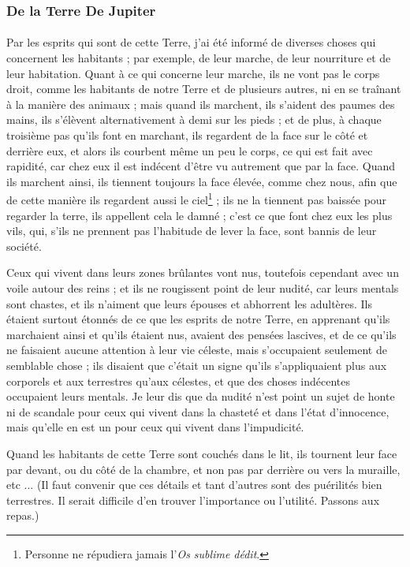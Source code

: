 \documentclass[a4paper, 11pt, oneside]{article}
\begin{document}
\subsubsection{De la Terre De Jupiter}
\paragraph{}
Par les esprits qui sont de cette Terre, j'ai été informé de diverses choses qui concernent les habitants ; par exemple, de leur marche, de leur nourriture et de leur habitation. Quant à ce qui concerne leur marche, ils ne vont pas le corps droit, comme les habitants de notre Terre et de plusieurs autres, ni en se traînant à la manière des animaux ; mais quand ils marchent, ils s'aident des paumes des mains, ils s'élèvent alternativement à demi sur les pieds ; et de plus, à chaque troisième pas qu'ils font en marchant, ils regardent de la face sur le côté et derrière eux, et alors ils courbent même un peu le corps, ce qui est fait avec rapidité, car chez eux il est indécent d'être vu autrement que par la face. Quand ils marchent ainsi, ils tiennent toujours la face élevée, comme chez nous, afin que de cette manière ils regardent aussi le ciel\footnote{Personne ne répudiera jamais l'\emph{Os sublime dédit}.} ; ils ne la tiennent pas baissée pour regarder la terre, ils appellent cela le damné ; c'est ce que font chez eux les plus vils, qui, s'ils ne prennent pas l'habitude de lever la face, sont bannis de leur société.

Ceux qui vivent dans leurs zones brûlantes vont nus, toutefois cependant avec un voile autour des reins ; et ils ne rougissent point de leur nudité, car leurs mentals sont chastes, et ils n'aiment que leurs épouses et abhorrent les adultères. Ils étaient surtout étonnés de ce que les esprits de notre Terre, en apprenant qu'ils marchaient ainsi et qu'ils étaient nus, avaient des pensées lascives, et de ce qu'ils ne faisaient aucune attention à leur vie céleste, mais s'occupaient seulement de semblable chose ; ils disaient que c'était un signe qu'ils s'appliquaient plus aux corporels et aux terrestres qu'aux célestes, et que des choses indécentes occupaient leurs mentals. Je leur dis que da nudité n'est point un sujet de honte ni de scandale pour ceux qui vivent dans la chasteté et dans l'état d'innocence, mais qu'elle en est un pour ceux qui vivent dans l'impudicité.

Quand les habitants de cette Terre sont couchés dans le lit, ils tournent leur face par devant, ou du côté de la chambre, et non pas par derrière ou vers la muraille, etc ... (Il faut convenir que ces détails et tant d'autres sont des puérilités bien terrestres. Il serait difficile d'en trouver l'importance ou l'utilité. Passons aux repas.)
\end{document}
